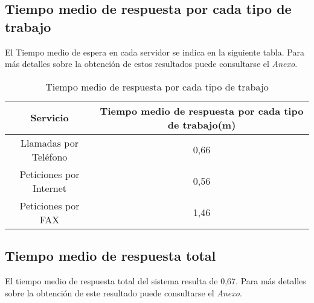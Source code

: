 \subsection{Tiempo medio de respuesta por cada tipo de trabajo}
El Tiempo medio de espera en cada servidor se indica en la siguiente tabla. Para más detalles sobre la obtención de estos resultados puede consultarse el \textit{Anexo}.\\

\begin{table}[H]
  \begin{center}
  \begin{tabular}{|c|c|}
    \hline
    \textbf{Servicio}       & \textbf{Tiempo medio de respuesta por cada tipo de trabajo(m)} \\ \hline
    Llamadas por Teléfono   & 0,66                   \\ \hline
    Peticiones por Internet & 0,56                  \\ \hline
    Peticiones por FAX      & 1,46                   \\ \hline
  \end{tabular}
\end{center}
  \caption{Tiempo medio de respuesta por cada tipo de trabajo}
  \end{table}
  
\subsection{Tiempo medio de respuesta total}
El tiempo medio de respuesta total del sistema resulta de 0,67. Para más detalles sobre la obtención de este resultado puede consultarse el \textit{Anexo}.\\